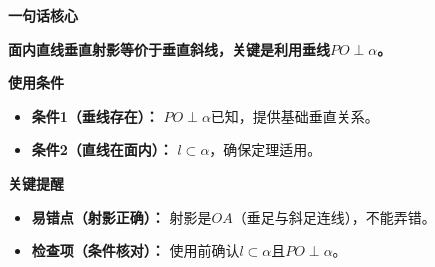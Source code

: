\begin{summarybox}

	\textbf{\textcolor{CSummary}{一句话核心}}

	\textbf{面内直线垂直射影等价于垂直斜线，关键是利用垂线$PO\perp\alpha$。}

	\medskip
	\textbf{\textcolor{CSummary}{使用条件}}
	\begin{itemize}[leftmargin=*, itemsep=0.5em, topsep=0.4em]
		\item \textbf{条件1（垂线存在）：} $PO\perp\alpha$已知，提供基础垂直关系。
		\item \textbf{条件2（直线在面内）：} $l\subset\alpha$，确保定理适用。
	\end{itemize}

	\medskip
	\textbf{\textcolor{CSummary}{关键提醒}}
	\begin{itemize}[leftmargin=*, itemsep=0.5em, topsep=0.4em]
		\item \textbf{易错点（射影正确）：} 射影是$OA$（垂足与斜足连线），不能弄错。
		\item \textbf{检查项（条件核对）：} 使用前确认$l\subset\alpha$且$PO\perp\alpha$。
	\end{itemize}
\end{summarybox}
